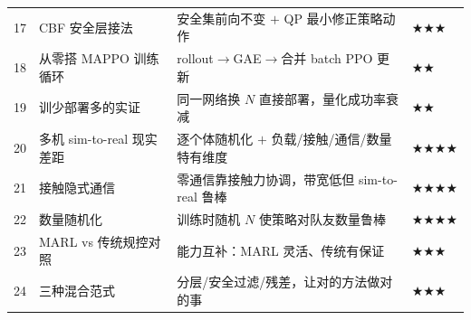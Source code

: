 \begin{table}[H]
\begin{tabular}{clll}
17 & CBF 安全层接法 & 安全集前向不变 $+$ QP 最小修正策略动作 & \(\bigstar\bigstar\bigstar\) \\
18 & 从零搭 MAPPO 训练循环 & rollout$\to$GAE$\to$合并 batch PPO 更新 & \(\bigstar\bigstar\) \\
19 & 训少部署多的实证 & 同一网络换 $N$ 直接部署，量化成功率衰减 & \(\bigstar\bigstar\) \\
20 & 多机 sim-to-real 现实差距 & 逐个体随机化 $+$ 负载/接触/通信/数量特有维度 & \(\bigstar\bigstar\bigstar\bigstar\) \\
21 & 接触隐式通信 & 零通信靠接触力协调，带宽低但 sim-to-real 鲁棒 & \(\bigstar\bigstar\bigstar\bigstar\) \\
22 & 数量随机化 & 训练时随机 $N$ 使策略对队友数量鲁棒 & \(\bigstar\bigstar\bigstar\bigstar\) \\
23 & MARL vs 传统规控对照 & 能力互补：MARL 灵活、传统有保证 & \(\bigstar\bigstar\bigstar\) \\
24 & 三种混合范式 & 分层/安全过滤/残差，让对的方法做对的事 & \(\bigstar\bigstar\bigstar\) \\
\bottomrule
\end{tabular}
\end{table}

